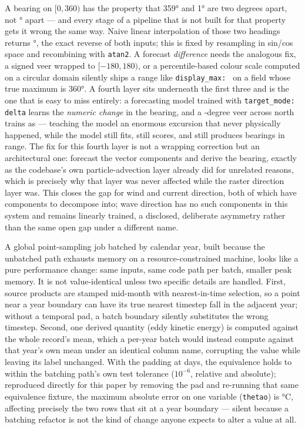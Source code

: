  A bearing on $[0,360)$ has the property that 359\si{\degree} and
1\si{\degree} are two degrees apart, not \CircReverse{}\si{\degree} apart ---
and every stage of a pipeline that is not built for that property gets it
wrong the same way. Naive linear interpolation of those two headings
returns \CircReverse{}\si{\degree}, the exact reverse of both inputs; this is
fixed by resampling in sin/cos space and recombining with \texttt{atan2}. A
forecast \emph{difference} needs the analogous fix, a signed veer wrapped to
$[-180,180)$, or a percentile-based colour scale computed on a circular
domain silently ships a range like \texttt{display\_max:\allowbreak{}
\CircLegendBug{}} on a field whose true maximum is 360\si{\degree}. A fourth
layer sits underneath the first three and is the one that is easy to miss
entirely: a forecasting model trained with \texttt{target\_mode: delta}
learns the \emph{numeric change} in the bearing, and a \CircDeltaVeer{}-degree
veer across north trains as \CircDeltaCross{} --- teaching the model an
enormous excursion that never physically happened, while the model still
fits, still scores, and still produces bearings in range. The fix for this
fourth layer is not a wrapping correction but an architectural one: forecast
the vector components and derive the bearing, exactly as the codebase's own
particle-advection layer already did for unrelated reasons, which is
precisely why that layer was never affected while the raster direction layer
was. This closes the gap for wind and current direction, both of which have
components to decompose into; wave direction has no such components in this
system and remains linearly trained, a disclosed, deliberate asymmetry
rather than the same open gap under a different name.

A global point-sampling job batched by calendar year, built because the
unbatched path exhausts memory on a resource-constrained machine, looks like
a pure performance change: same inputs, same code path per batch, smaller
peak memory. It is not value-identical unless two specific details are
handled. First, source products are stamped mid-month with nearest-in-time
selection, so a point near a year boundary can have its true nearest
timestep fall in the adjacent year; without a temporal pad, a batch boundary
silently substitutes the wrong timestep. Second, one derived quantity (eddy
kinetic energy) is computed against the whole record's mean, which a
per-year batch would instead compute against that year's own mean under an
identical column name, corrupting the value while leaving its label
unchanged. With the padding at \BatchPadDays{} days, the equivalence holds
to within the batching path's own test tolerance ($10^{-6}$, relative and
absolute); reproduced directly for this paper by removing the pad and
re-running that same equivalence fixture, the maximum absolute error on one
variable (\texttt{thetao}) is \BatchThetaoErrorNoPad{}\si{\celsius},
affecting precisely the two rows that sit at a year boundary --- silent
because a batching refactor is not the kind of change anyone expects to
alter a value at all.

